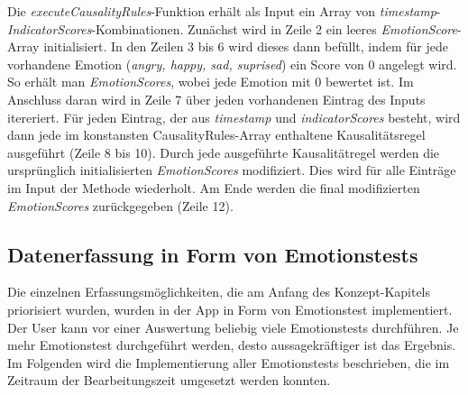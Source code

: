 Die\textit{ executeCausalityRules}-Funktion erhält als Input ein Array von \textit{timestamp}-\textit{IndicatorScores}-Kombinationen. Zunächst wird in Zeile 2 ein leeres \textit{EmotionScore}-Array initialisiert. In den Zeilen 3 bis 6 wird dieses dann befüllt, indem für jede vorhandene Emotion (\textit{angry, happy, sad, suprised}) ein Score von 0 angelegt wird. So erhält man \textit{EmotionScores}, wobei jede Emotion mit 0 bewertet ist. \newline
Im Anschluss daran wird in Zeile 7 über jeden vorhandenen Eintrag des Inputs itereriert. Für jeden Eintrag, der aus \textit{timestamp} und \textit{indicatorScores} besteht, wird dann jede im konstansten CausalityRules-Array enthaltene Kausalitätsregel ausgeführt (Zeile 8 bis 10). Durch jede ausgeführte Kausalitätregel werden die ursprünglich initialisierten \textit{EmotionScores} modifiziert. Dies wird für alle Einträge im Input der Methode wiederholt. Am Ende werden die final modifizierten \textit{EmotionScores} zurückgegeben (Zeile 12). 
\subsection{Datenerfassung in Form von Emotionstests}
Die einzelnen Erfassungsmöglichkeiten, die am Anfang des Konzept-Kapitels priorisiert wurden, wurden in der App in Form von Emotionstest implementiert. Der User kann vor einer Auswertung beliebig viele Emotionstests durchführen. Je mehr Emotionstest durchgeführt werden, desto aussagekräftiger ist das Ergebnis. Im Folgenden wird die Implementierung aller Emotionstests beschrieben, die im Zeitraum der Bearbeitungszeit umgesetzt werden konnten.
